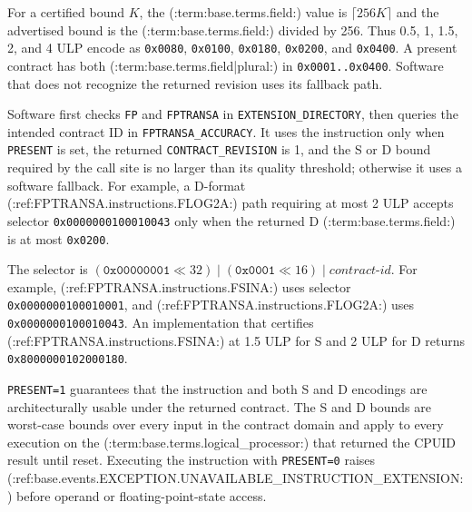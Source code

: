 For a certified bound $K$, the (:term:base.terms.field:) value is $\lceil 256K\rceil$ and the advertised bound is the (:term:base.terms.field:) divided by
256. Thus 0.5, 1, 1.5, 2, and 4 ULP encode as \texttt{0x0080}, \texttt{0x0100}, \texttt{0x0180},
\texttt{0x0200}, and \texttt{0x0400}. A present contract has both (:term:base.terms.field|plural:) in \texttt{0x0001..0x0400}.
Software that does not recognize the returned revision uses its fallback path.

Software first checks \texttt{FP} and \texttt{FPTRANSA} in \texttt{EXTENSION\_DIRECTORY}, then queries the intended
contract ID in \texttt{FPTRANSA\_ACCURACY}. It uses the instruction only when \texttt{PRESENT} is set, the returned
\texttt{CONTRACT\_REVISION} is 1, and the S or D bound required by the call site is no larger than its quality
threshold; otherwise it
uses a software fallback. For example, a D-format (:ref:FPTRANSA.instructions.FLOG2A:) path requiring at most 2 ULP accepts selector
\texttt{0x0000000100010043} only when the returned D (:term:base.terms.field:) is at most \texttt{0x0200}.

The selector is $(\texttt{0x00000001} \ll 32) \mathbin{|} (\texttt{0x0001} \ll 16) \mathbin{|}
\textit{contract-id}$. For example, (:ref:FPTRANSA.instructions.FSINA:) uses selector \texttt{0x0000000100010001}, and
(:ref:FPTRANSA.instructions.FLOG2A:) uses \texttt{0x0000000100010043}. An implementation that certifies (:ref:FPTRANSA.instructions.FSINA:) at 1.5 ULP for
S and 2 ULP for D returns \texttt{0x8000000102000180}.

\texttt{PRESENT=1} guarantees that the instruction and both S and D encodings are architecturally usable under the
returned contract. The S and D bounds are worst-case bounds over every input in the contract domain and apply to
every execution on the (:term:base.terms.logical_processor:) that returned the CPUID result until reset. Executing the instruction with
\texttt{PRESENT=0} raises (:ref:base.events.EXCEPTION.UNAVAILABLE_INSTRUCTION_EXTENSION:) before operand or floating-point-state access.


